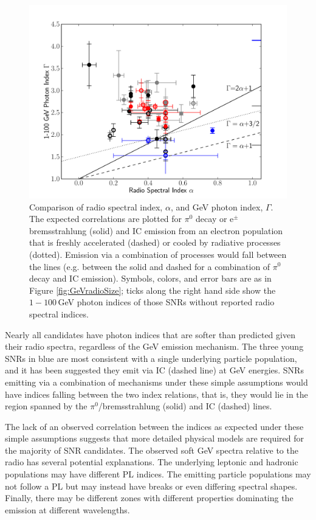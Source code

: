 \begin{figure}[h!]
	\centering
	\includegraphics[width=1.0\columnwidth]{figures/radio_vs_gamma_index.pdf}
	\caption[Comparison of radio spectral index, $\alpha$, and GeV photon index, $\Gamma$.]{Comparison of radio spectral index, $\alpha$, and GeV photon index, $\Gamma$. The expected correlations are plotted for $\pi^0$ decay or e$^{\pm}$ bremsstrahlung (solid) and IC emission from an electron population that is freshly accelerated (dashed) or cooled by radiative processes (dotted). Emission via a combination of processes would fall between the lines (e.g. between the solid and dashed for a combination of $\pi^0$ decay and IC emission).  Symbols, colors, and error bars are as in Figure \ref{fig:GeVradioSize}; ticks along the right hand side show the $1-100$\,GeV photon indices of those SNRs without reported radio spectral indices.
	}
	\label{fig:GeVradioIndex}
\end{figure}

Nearly all candidates have \gam{} photon indices that are softer than predicted given their radio spectra, regardless of the GeV emission mechanism. The three young SNRs in blue are most consistent with a single underlying particle population, and it has been suggested they emit via IC (dashed line) at GeV energies. SNRs emitting via a combination of mechanisms under these simple assumptions would have indices falling between the two index relations, that is, they would lie in the region spanned by the $\pi^0$/bremsstrahlung (solid) and IC (dashed) lines. 

The lack of an observed correlation between the indices as expected under these simple assumptions suggests that more detailed physical models are required for the majority of SNR candidates. The observed soft GeV spectra relative to the radio has several potential explanations. 
The underlying leptonic and hadronic populations may have different PL indices. The emitting particle populations may not follow a PL but may instead have breaks or even differing spectral shapes. Finally, there may be different zones with different properties dominating the emission at different wavelengths.


